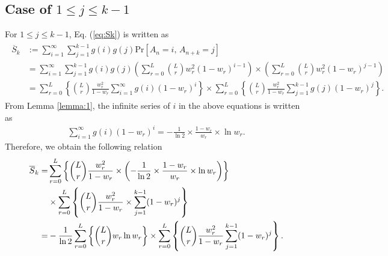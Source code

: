 \subsection{Case of $1 \leq j \leq k-1$}
For $1 \leq j \leq k-1$, Eq. (\ref{eq:Sk}) is written as
\begin{align}\begin{split}
  \overline{S}_{k} 
  &:= \sum_{i=1}^{\infty} \sum_{j=1}^{k-1} g(i) g(j) \mathrm{Pr} \left[ A_n=i,\,A_{n+k}=j \right] \\
  &= \sum_{i=1}^{\infty} \sum_{j=1}^{k-1} g(i) g(j) \left( \sum_{r=0}^{L} \binom{L}{r}w_r^2 (1-w_r)^{i-1} \right) \times \left( \sum_{r=0}^{L} \binom{L}{r}w_r^2 (1-w_r)^{j-1} \right) \\
  &= \sum_{r=0}^{L} \left\{\binom{L}{r} \frac{w_r^2}{1-w_r} \sum_{i=1}^{\infty} g(i)(1-w_r)^{i} \right\}
  \times \sum_{r=0}^{L} \left\{ \binom{L}{r} \frac{w_r^2}{1-w_r} \sum_{j=1}^{k-1} g(j)(1-w_r)^{j} \right\}.
\end{split}\end{align}
From Lemma \ref{lemma:1}, the infinite series of $i$ in the above equations is written as
\begin{align}
	\sum_{i=1}^{\infty} g(i) (1 - w_r)^{i} = - \frac{1}{\ln 2} \times \frac{1-w_r}{w_r}\times\ln w_r.
\end{align}
%
Therefore, we obtain the following relation
\begin{align}\begin{split}
  \overline{S}_{k}
  =& \sum_{r=0}^{L} \left\{ \dbinom{L}{r} \frac{w_r^2}{1-w_r}  \times \left(- \frac{1}{\ln 2} \times \frac{1-w_r}{w_r}\times\ln w_r \right) \right\} \\
  &\times \sum_{r=0}^{L} \left\{ \dbinom{L}{r} \frac{w_r^2}{1-w_r} \times \sum_{j=1}^{k-1} (1-w_r)^{j} \right\} \\
  =&-\frac{1}{\ln 2}\sum_{r=0}^{L} \left\{ \dbinom{L}{r} w_r \ln w_r \right\} \times \sum_{r=0}^{L} \left\{ \dbinom{L}{r} \frac{w_r^2}{1-w_r} \sum_{j=1}^{k-1} (1-w_r)^{j} \right\}.
\end{split}\end{align}
